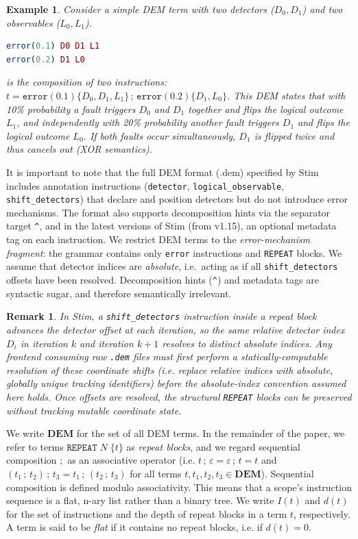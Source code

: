 \documentclass[11pt,a4paper]{article}
\newtheorem{example}[theorem]{Example}
\newtheorem{remark}[theorem]{Remark}
\begin{document}
\begin{example}
Consider a simple DEM term with two detectors ($D_0, D_1$) and two observables ($L_0, L_1$).
\begin{lstlisting}[language=DEM]
error(0.1) D0 D1 L1
error(0.2) D1 L0
\end{lstlisting}
is the composition of two instructions: $t = \mathtt{error}(0.1)\{D_0, D_1, L_1\} \,;\, \mathtt{error}(0.2)\{D_1, L_0\}$. 
This DEM states that with 10\% probability a fault triggers $D_0$ and $D_1$ together and flips the logical outcome $L_1$, and independently with 20\% probability another fault triggers $D_1$ and flips the logical outcome $L_0$. If both faults occur simultaneously, $D_1$ is flipped twice and thus cancels out (XOR semantics). 
\end{example}

It is important to note that the full DEM format (.dem) specified by Stim includes annotation instructions (\texttt{detector}, \texttt{logical\_observable}, \texttt{shift\_detectors}) that declare and position detectors but do not introduce error mechanisms. The format also supports decomposition hints via the separator target \texttt{\^{}}, and in the latest versions of Stim (from v1.15), an optional metadata tag on each instruction.
We restrict DEM terms to the \emph{error-mechanism fragment}: the grammar
contains only \texttt{error} instructions and \texttt{REPEAT} blocks.
We assume that detector indices are \emph{absolute}, i.e.\ acting as if all
\texttt{shift\_detectors} offsets have been resolved. Decomposition hints (\texttt{\^{}}) and metadata tags are syntactic sugar, and therefore semantically irrelevant.

\begin{remark}
In Stim, a \texttt{shift\_detectors} instruction inside a repeat block advances the detector offset at each iteration, so the same relative detector index $D_i$ in iteration $k$ and iteration $k{+}1$ resolves to distinct absolute indices. 
Any frontend consuming raw \texttt{.dem} files must first perform a statically-computable resolution of these coordinate shifts (i.e. replace relative indices with absolute, globally unique tracking identifiers) before the absolute-index convention assumed here holds. Once offsets are resolved, the structural \texttt{REPEAT} blocks can be preserved without tracking mutable coordinate state.
\end{remark}

We write $\mathbf{DEM}$ for the set of all DEM terms. In the remainder of the paper, we refer to terms $\mathtt{REPEAT}\;N\;\{t\}$ as \emph{repeat blocks}, and we regard sequential composition $;$ as an associative operator (i.e. $t\,;\,\varepsilon = \varepsilon\,;\,t = t$ and
$(t_1\,;\,t_2)\,;\,t_3 = t_1\,;\,(t_2\,;\,t_3)$ for all terms $t, t_1, t_2, t_3 \in \mathbf{DEM}$). Sequential composition is defined modulo associativity. This means that a scope's instruction sequence is a flat, n-ary list rather than a binary tree. 
We write $I(t)$ and $d(t)$ for the set of instructions and the depth of repeat blocks in a term $t$, respectively. A term is said to be \emph{flat} if it contains no repeat blocks, i.e. if $d(t) = 0$.
\end{document}
